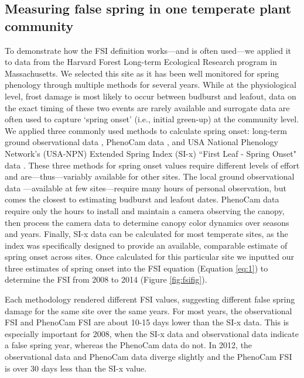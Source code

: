 \documentclass{article}\usepackage[]{graphicx}\usepackage[]{color}
\begin{document}
\subsection*{Measuring false spring in one temperate plant community}
To demonstrate how the FSI definition works---and is often used---we applied it to data from the Harvard Forest Long-term Ecological Research program in Massachusetts. We selected this site as it has been well monitored for spring phenology through multiple methods for several years. While at the physiological level, frost damage is most likely to occur between budburst and leafout, data on the exact timing of these two events are rarely available and surrogate data are often used to capture `spring onset' (i.e., initial green-up) at the community level. We applied three commonly used methods to calculate spring onset: long-term ground observational data \citep{Okeefe2014}, PhenoCam data \citep{Richardson2015}, and USA National Phenology Network's (USA-NPN) Extended Spring Index (SI-x) ``First Leaf - Spring Onset" data \citep{USA-NPN2016}. These three methods for spring onset values require different levels of effort and are---thus---variably available for other sites. The local ground observational data \citep{Okeefe2014}---available at few sites---require many hours of personal observation, but comes the closest to estimating budburst and leafout dates. PhenoCam data require only the hours to install and maintain a camera observing the canopy, then process the camera data to determine canopy color dynamics over seasons and years. Finally, SI-x data can be calculated for most temperate sites, as the index was specifically designed to provide an available, comparable estimate of spring onset across sites. Once calculated for this particular site we inputted our three estimates of spring onset into the FSI equation (Equation \ref{eq:1}) to determine the FSI from 2008 to 2014 (Figure \ref{fig:fsifig}). 

Each methodology rendered different FSI values, suggesting different false spring damage for the same site over the same years. For most years, the observational FSI and PhenoCam FSI are about 10-15 days lower than the SI-x data. This is especially important for 2008, when the SI-x data and observational data indicate a false spring year, whereas the PhenoCam data do not. In 2012, the observational data and PhenoCam data diverge slightly and the PhenoCam FSI is over 30 days less than the SI-x value.
\end{document}
